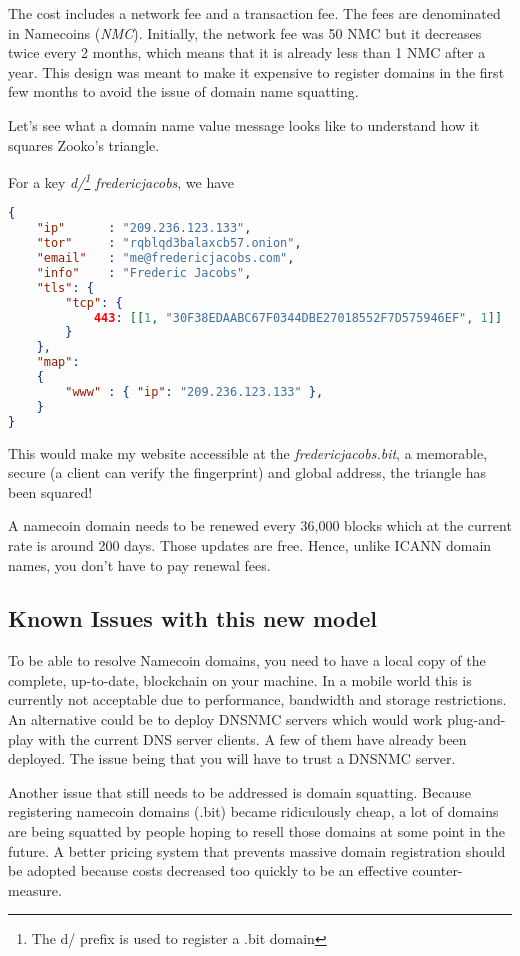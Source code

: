 \documentclass{vldb}
\begin{document}
The cost includes a network fee and a transaction fee. The fees are denominated in Namecoins (\emph{NMC}). Initially, the network fee was 50 NMC but it decreases twice every 2 months, which means that it is already less than 1 NMC after a year. This design was meant to make it expensive to register domains in the first few months to avoid the issue of domain name squatting.

Let's see what a domain name value message looks like to understand how it squares Zooko's triangle.

For a key \emph{d/\footnote{The d/ prefix is used to register a .bit domain} fredericjacobs}, we have 

\begin{lstlisting}[language=json,firstnumber=1]
{
    "ip"      : "209.236.123.133",
    "tor"     : "rqblqd3balaxcb57.onion",
    "email"   : "me@fredericjacobs.com",
    "info"    : "Frederic Jacobs",
    "tls": {
        "tcp": {
            443: [[1, "30F38EDAABC67F0344DBE27018552F7D575946EF", 1]]
        }
    },
    "map":
    {
        "www" : { "ip": "209.236.123.133" },
    }
}
\end{lstlisting}

This would make my website accessible at the \emph{fredericjacobs.bit}, a memorable, secure (a client can verify the fingerprint) and global address, the triangle has been squared!

A namecoin domain needs to be renewed every 36,000 blocks which at the current rate is around 200 days. Those updates are free. Hence, unlike ICANN domain names, you don't have to pay renewal fees.

\subsection{Known Issues with this new model}

To be able to resolve Namecoin domains, you need to have a local copy of the complete, up-to-date, blockchain on your machine. In a mobile world this is currently not acceptable due to performance, bandwidth and storage restrictions. An alternative could be to deploy DNSNMC servers which would work plug-and-play with the current DNS server clients. A few of them have already been deployed\cite{DNSNMCList}. The issue being that you will have to trust a DNSNMC\cite{okTurtles} server.

Another issue that still needs to be addressed is domain squatting. Because registering namecoin domains (.bit) became ridiculously cheap, a lot of domains are being squatted by people hoping to resell those domains at some point in the future. A better pricing system that prevents massive domain registration should be adopted because costs decreased too quickly to be an effective counter-measure.
\end{document}

